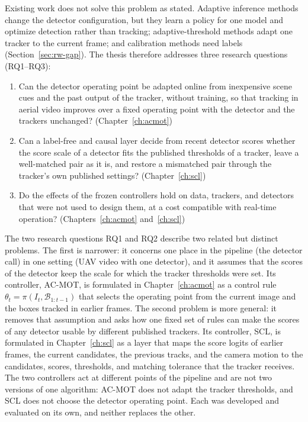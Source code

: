 Existing work does not solve this problem as stated. Adaptive inference methods change the detector configuration, but they learn a policy for one model and optimize detection rather than tracking; adaptive-threshold methods adapt one tracker to the current frame; and calibration methods need labels (Section~\ref{sec:rw-gap}). The thesis therefore addresses three research questions (RQ1--RQ3):
\begin{enumerate}
\item[\textbf{RQ1}] Can the detector operating point be adapted online from inexpensive scene cues and the past output of the tracker, without training, so that tracking in aerial video improves over a fixed operating point with the detector and the trackers unchanged? (Chapter~\ref{ch:acmot})
\item[\textbf{RQ2}] Can a label-free and causal layer decide from recent detector scores whether the score scale of a detector fits the published thresholds of a tracker, leave a well-matched pair as it is, and restore a mismatched pair through the tracker's own published settings? (Chapter~\ref{ch:scl})
\item[\textbf{RQ3}] Do the effects of the frozen controllers hold on data, trackers, and detectors that were not used to design them, at a cost compatible with real-time operation? (Chapters~\ref{ch:acmot} and~\ref{ch:scl})
\end{enumerate}

The two research questions RQ1 and RQ2 describe two related but distinct problems. The first is narrower: it concerns one place in the pipeline (the detector call) in one setting (UAV video with one detector), and it assumes that the scores of the detector keep the scale for which the tracker thresholds were set. Its controller, AC-MOT, is formulated in Chapter~\ref{ch:acmot} as a control rule $\theta_t=\pi(I_t,\mathcal{B}_{1:t-1})$ that selects the operating point from the current image and the boxes tracked in earlier frames. The second problem is more general: it removes that assumption and asks how one fixed set of rules can make the scores of any detector usable by different published trackers. Its controller, SCL, is formulated in Chapter~\ref{ch:scl} as a layer that maps the score logits of earlier frames, the current candidates, the previous tracks, and the camera motion to the candidates, scores, thresholds, and matching tolerance that the tracker receives. The two controllers act at different points of the pipeline and are not two versions of one algorithm: AC-MOT does not adapt the tracker thresholds, and SCL does not choose the detector operating point. Each was developed and evaluated on its own, and neither replaces the other.

